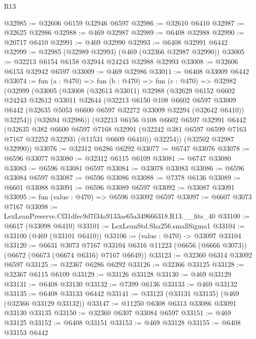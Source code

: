 \begin{lexlean}{R13}
\begin{coremodule}
@32985 := @32606 @6159 @32946 @6597
@32986 := @32610 @6410
@32987 := @32625 @32986
@32988 := @469 @32987
@32989 := @6408 @32988
@32990 := @20717 @6410
@32991 := @469 @32990
@32993 := @6408 @32991 @6442
@32999 := @32985 (@32989 @32993) (@469 (@32366 @32987 @32990))
@33005 := @32213 @6154 @6158 @32944 @24243 @32988 @32993
@33008 := @32606 @6153 @32942 @6597
@33009 := @469 @32986
@33011 := @6408 @33009 @6442
@33074 := fun (a : @470) =>
  fun (b : @470) =>
  fun (c : @470) =>
  @32982
    (@32999
      (@33005
        (@33008
          (@32613 @33011)
          @32988
          (@32629
            @6152
            @6602
            @24243
            @32612
            @33011
            @32644
            (@32213
              @6150
              @108
              @6602
              @6597
              @33009
              @6442
              (@32635 @5053 @6600 @6597 @32272 @33009 @32294 (@32642 @6410))
              @32254))
          (@32694 @32986))
        (@32213
          @6156
          @108
          @6602
          @6597
          @32991
          @6442
          (@32635
            @382
            @6600
            @6597
            @7168
            @32991
            (@32242 @381 @6597 @6599 @7163 @7167 @32252 @32293)
            (@11531 @6609 @6410))
          @32254))
      (@32502 @32987 @32990))
@33076 := @32312 @6286 @6292
@33077 := @6747 @33076
@33078 := @6596 @33077
@33080 := @32312 @6115 @6109
@33081 := @6747 @33080
@33083 := @6596 @33081 @6597
@33084 := @33078 @33083
@33086 := @6596 @33084 @6597
@33087 := @6596 @33086
@33088 := @7378 @6136
@33089 := @6601 @33088
@33091 := @6596 @33089 @6597
@33092 := @33087 @33091
@33095 := fun (value : @470) => @6596 @33092 @6597
@33097 := @6607 @3073 @7167
@33098 := LexLeanPreserve.Cf31dfec9d7f34a9133ae65a349666318.R13.__fits_40
@33100 := @6617 (@33098 @6410)
@33101 := LexLeanStd.Sha256.smallSigma1
@33104 := @33100 (@469 (@33101 @6410))
@33106 := (value : @470) -> @33097 @33104
@33120 := @6631
    @3073
    @7167
    @33104
    @6316
    @11223
    (@6656 (@6666 @3073))
    (@6672 (@6673 (@6674 @6316) @7167 @6649))
@33123 := @32360 @6314 @33092 @6597
@33125 := @32367 @6286 @6292
@33126 := @32366 @33125
@33128 := @32367 @6115 @6109
@33129 := @33126 @33128
@33130 := @469 @33129
@33131 := @6408 @33130
@33132 := @7399 @6136
@33133 := @469 @33132
@33135 := @6408 @33133 @6442
@33141 := @33123 (@33131 @33135) (@469 (@32366 @33129 @33132))
@33147 := @11250 @6308 @6313 @33086 @33091 @33130 @33135
@33150 := @32360 @6307 @33084 @6597
@33151 := @469 @33125
@33152 := @6408 @33151
@33153 := @469 @33128
@33155 := @6408 @33153 @6442

\end{coremodule}
\end{lexlean}
